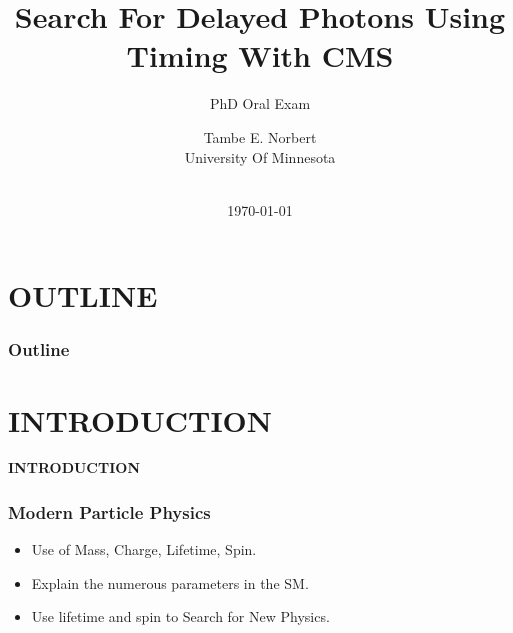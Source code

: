 \documentclass{beamer}
\title{Search For Delayed Photons Using Timing With CMS}
\subtitle{PhD Oral Exam}
\author[Tambe E. Norbert]{Tambe E. Norbert \\ University Of Minnesota} %
\date{ \\ \today}
\begin{document}
\begin{frame}
\titlepage
\begin{center}
\href{mailto:norbe072@umn.edu}{}
\end{center}
\end{frame}




\section*{OUTLINE}
{
\begin{frame}
\frametitle{\huge{Outline}}
\tableofcontents
\end{frame}
}
\section{INTRODUCTION}

{
\begin{frame}
  \begin{center}
   \textcolor{UMN@Maroon}{\Huge{\textbf{INTRODUCTION}}}
  \end{center}
\end{frame}
}

\begin{frame}
\frametitle{Modern Particle Physics}
\begin{itemize}
\item Use of Mass, Charge, Lifetime, Spin.
\item Explain the numerous parameters in the SM.
\item Use lifetime and spin to Search for New Physics.
\end{itemize}
\end{frame}
\end{document}
